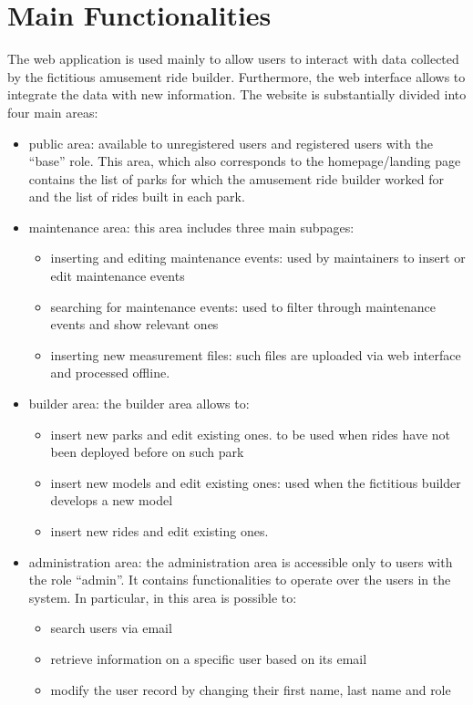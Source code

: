 \section{Main Functionalities}

The web application is used mainly to allow users to interact with data collected by the fictitious
amusement ride builder.
Furthermore, the web interface allows to integrate the data with new information.
The website is substantially divided into four main areas:
\begin{itemize}
    \item  public area: available to unregistered users and registered users with the “base” role. This area, which also corresponds to the homepage/landing page contains the list of parks for which the amusement ride builder worked for and the list of rides built in each park.
    \item maintenance area: this area includes three main subpages:
    \begin{itemize}
        \item inserting and editing maintenance events: used by maintainers to insert or edit maintenance events
        \item searching for maintenance events: used to filter through maintenance events and show relevant ones
        \item inserting new measurement files: such files are uploaded via web interface and processed offline.
    \end{itemize}
    \item builder area: the builder area allows to:
    \begin{itemize}
        \item insert new parks and edit existing ones. to be used when rides have not been deployed before on such park
        \item insert new models and edit existing ones: used when the fictitious builder develops a new model
        \item insert new rides and edit existing ones.
    \end{itemize}
    \item administration area: the administration area is accessible only to users with the role “admin”. It contains functionalities to operate over the users in the system. In particular, in this area is possible to:
    \begin{itemize}
        \item search users via email
        \item retrieve information on a specific user based on its email
        \item modify the user record by changing their first name, last name and role
    \end{itemize}
\end{itemize}


